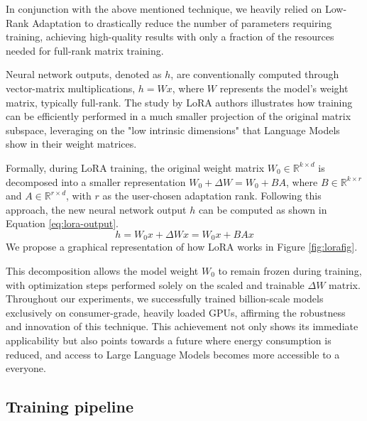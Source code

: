 \documentclass{article}
\begin{document}
In conjunction with the above mentioned technique, we heavily relied on Low-Rank Adaptation to drastically reduce the number of parameters requiring training, achieving high-quality results with only a fraction of the resources needed for full-rank matrix training.

Neural network outputs, denoted as \(h\), are conventionally computed through vector-matrix multiplications, \(h = Wx\), where \(W\) represents the model's weight matrix, typically full-rank. The study by LoRA authors illustrates how training can be efficiently performed in a much smaller projection of the original matrix subspace, leveraging on the "low intrinsic dimensions" that Language Models show in their weight matrices.

Formally, during LoRA training, the original weight matrix \(W_0 \in \mathbb{R}^{k \times d}\) is decomposed into a smaller representation \(W_0 + \Delta W = W_0 + BA\), where \(B \in \mathbb{R}^{k \times r}\) and \(A \in \mathbb{R}^{r \times d}\), with \(r\) as the user-chosen adaptation rank. Following this approach, the new neural network output \(h\) can be computed as shown in Equation \ref{eq:lora-output}.
\begin{equation}
    h = W_0x + \Delta Wx = W_0x + BAx
    \label{eq:lora-output}
\end{equation}
We propose a graphical representation of how LoRA works in Figure \ref{fig:lorafig}.


This decomposition allows the model weight \(W_0\) to remain frozen during training, with optimization steps performed solely on the scaled and trainable \(\Delta W\) matrix. Throughout our experiments, we successfully trained billion-scale models exclusively on consumer-grade, heavily loaded GPUs, affirming the robustness and innovation of this technique. This achievement not only shows its immediate applicability but also points towards a future where energy consumption is reduced, and access to Large Language Models becomes more accessible to a everyone.


\subsection{Training pipeline}
\end{document}
